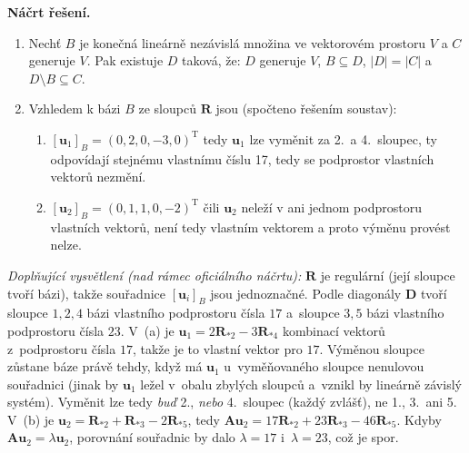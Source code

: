 \medskip
\noindent\textbf{Náčrt řešení.}\par
\begin{enumerate}
  \item Nechť $B$ je konečná lineárně nezávislá množina ve vektorovém prostoru $V$ a $C$ generuje $V$. Pak existuje $D$ taková, že: $D$ generuje $V$, $B \subseteq D$, $|D| = |C|$ a $D \setminus B \subseteq C$.
  \item Vzhledem k bázi $B$ ze sloupců $\mathbf{R}$ jsou (spočteno řešením soustav):
    \begin{enumerate}
      \item[(a)] $[\mathbf{u}_1]_B = (0,2,0,-3,0)^{\mathrm{T}}$ tedy $\mathbf{u}_1$ lze vyměnit za 2.\ a 4.\ sloupec, ty odpovídají stejnému vlastnímu číslu 17, tedy se podprostor vlastních vektorů nezmění.
      \item[(b)] $[\mathbf{u}_2]_B = (0,1,1,0,-2)^{\mathrm{T}}$ čili $\mathbf{u}_2$ neleží v ani jednom podprostoru vlastních vektorů, není tedy vlastním vektorem a proto výměnu provést nelze.
    \end{enumerate}
\end{enumerate}

\medskip
\noindent\textit{Doplňující vysvětlení (nad rámec oficiálního náčrtu):} $\mathbf{R}$ je regulární (její sloupce tvoří bázi), takže souřadnice $[\mathbf{u}_i]_B$ jsou jednoznačné. Podle diagonály $\mathbf{D}$ tvoří sloupce $1,2,4$ bázi vlastního podprostoru čísla $17$ a~sloupce $3,5$ bázi vlastního podprostoru čísla $23$. V~(a) je $\mathbf{u}_1=2\mathbf{R}_{*2}-3\mathbf{R}_{*4}$ kombinací vektorů z~podprostoru čísla $17$, takže je to vlastní vektor pro $17$. Výměnou sloupce zůstane báze právě tehdy, když má $\mathbf{u}_1$ u~vyměňovaného sloupce nenulovou souřadnici (jinak by $\mathbf{u}_1$ ležel v~obalu zbylých sloupců a~vznikl by lineárně závislý systém). Vyměnit lze tedy \emph{buď} 2., \emph{nebo} 4.\ sloupec (každý zvlášť), ne 1., 3.\ ani 5. V~(b) je $\mathbf{u}_2=\mathbf{R}_{*2}+\mathbf{R}_{*3}-2\mathbf{R}_{*5}$, tedy $\mathbf{A}\mathbf{u}_2=17\mathbf{R}_{*2}+23\mathbf{R}_{*3}-46\mathbf{R}_{*5}$. Kdyby $\mathbf{A}\mathbf{u}_2=\lambda\mathbf{u}_2$, porovnání souřadnic by dalo $\lambda=17$ i~$\lambda=23$, což je spor.
